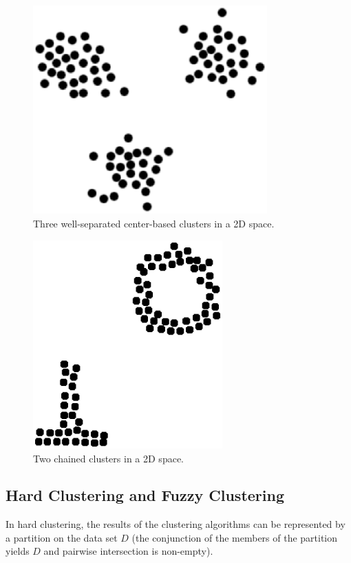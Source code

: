 \documentclass[a4paper,12pt,english]{report}
\begin{document}
\begin{figure}[!ht]
\begin{center}
\includegraphics [height=8cm]{images/clusters.eps}
\end{center}
\caption{Three well-separated center-based clusters in a 2D space.}
\label{clusters}
\end{figure}

\begin{figure}[!ht]
\begin{center}
\includegraphics [height=8cm]{images/clusters2.eps}
\end{center}
\caption{Two chained clusters in a 2D space.}
\label{clusters2}
\end{figure}

\subsection{Hard Clustering and Fuzzy Clustering}

In hard clustering, the results of the clustering algorithms can be represented by a partition on the data set $D$ (the conjunction of the members of the partition yields $D$ and pairwise intersection is non-empty).
\end{document}

